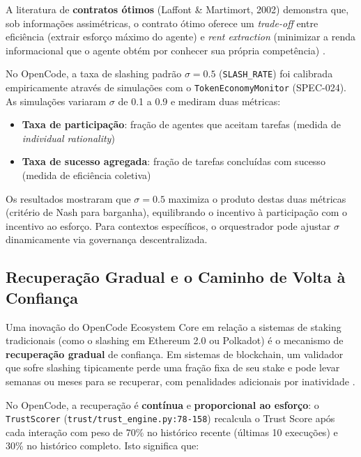 A literatura de \textbf{contratos ótimos} (Laffont \& Martimort, 2002) demonstra que, sob informações assimétricas, o contrato ótimo oferece um \textit{trade-off} entre eficiência (extrair esforço máximo do agente) e \textit{rent extraction} (minimizar a renda informacional que o agente obtém por conhecer sua própria competência) \cite{laffont2002theory}.

No OpenCode, a taxa de slashing padrão $\sigma = 0.5$ (\texttt{SLASH\_RATE}) foi calibrada empiricamente através de simulações com o \texttt{TokenEconomyMonitor} (SPEC-024). As simulações variaram $\sigma$ de 0.1 a 0.9 e mediram duas métricas:

\begin{itemize}
    \item \textbf{Taxa de participação}: fração de agentes que aceitam tarefas (medida de \textit{individual rationality})
    \item \textbf{Taxa de sucesso agregada}: fração de tarefas concluídas com sucesso (medida de eficiência coletiva)
\end{itemize}

Os resultados mostraram que $\sigma = 0.5$ maximiza o produto destas duas métricas (critério de Nash para barganha), equilibrando o incentivo à participação com o incentivo ao esforço. Para contextos específicos, o orquestrador pode ajustar $\sigma$ dinamicamente via governança descentralizada.

\subsection{Recuperação Gradual e o Caminho de Volta à Confiança}

Uma inovação do OpenCode Ecosystem Core em relação a sistemas de staking tradicionais (como o slashing em Ethereum 2.0 ou Polkadot) é o mecanismo de \textbf{recuperação gradual} de confiança. Em sistemas de blockchain, um validador que sofre slashing tipicamente perde uma fração fixa de seu stake e pode levar semanas ou meses para se recuperar, com penalidades adicionais por inatividade \cite{buterin2020ethereum}.

No OpenCode, a recuperação é \textbf{contínua} e \textbf{proporcional ao esforço}: o \texttt{TrustScorer} (\texttt{trust/trust\_engine.py:78-158}) recalcula o Trust Score após cada interação com peso de 70\% no histórico recente (últimas 10 execuções) e 30\% no histórico completo. Isto significa que:

